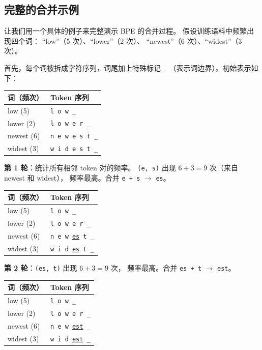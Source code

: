 \subsection{完整的合并示例}

让我们用一个具体的例子来完整演示 BPE 的合并过程。
假设训练语料中频繁出现四个词：
“low”（5 次）、“lower”（2 次）、
“newest”（6 次）、“widest”（3 次）。

首先，每个词被拆成字符序列，词尾加上特殊标记 \texttt{\_}
（表示词边界）。初始表示如下：

\begin{center}\small
\renewcommand{\arraystretch}{1.3}
\begin{tabular}{ll}
\toprule
\rowcolor{figLightGray}
\textbf{词（频次）} & \textbf{Token 序列} \\
\midrule
low (5)    & \texttt{l o w \_} \\
lower (2)  & \texttt{l o w e r \_} \\
newest (6) & \texttt{n e w e s t \_} \\
widest (3) & \texttt{w i d e s t \_} \\
\bottomrule
\end{tabular}
\end{center}

\textbf{第 1 轮}：统计所有相邻 token 对的频率。
\texttt{(e, s)} 出现 $6 + 3 = 9$ 次（来自 newest 和 widest），
频率最高。合并 \texttt{e + s} $\to$ \texttt{es}。

\begin{center}\small
\renewcommand{\arraystretch}{1.3}
\begin{tabular}{ll}
\toprule
\rowcolor{figLightGray}
\textbf{词（频次）} & \textbf{Token 序列} \\
\midrule
low (5)    & \texttt{l o w \_} \\
lower (2)  & \texttt{l o w e r \_} \\
newest (6) & \texttt{n e w \underline{es} t \_} \\
widest (3) & \texttt{w i d \underline{es} t \_} \\
\bottomrule
\end{tabular}
\end{center}

\textbf{第 2 轮}：\texttt{(es, t)} 出现 $6 + 3 = 9$ 次，
频率最高。合并 \texttt{es + t} $\to$ \texttt{est}。

\begin{center}\small
\renewcommand{\arraystretch}{1.3}
\begin{tabular}{ll}
\toprule
\rowcolor{figLightGray}
\textbf{词（频次）} & \textbf{Token 序列} \\
\midrule
low (5)    & \texttt{l o w \_} \\
lower (2)  & \texttt{l o w e r \_} \\
newest (6) & \texttt{n e w \underline{est} \_} \\
widest (3) & \texttt{w i d \underline{est} \_} \\
\bottomrule
\end{tabular}
\end{center}

